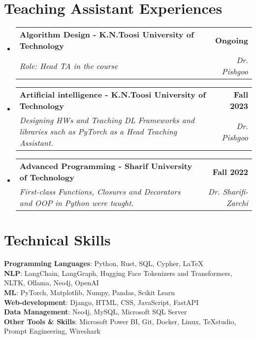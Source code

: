 \documentclass[letterpaper,11pt]{article}
\makeatletter
\newcommand{\resumeSubheading}[4]{
	\vspace{-2pt}\item
	\begin{tabular*}{1.0\textwidth}[t]{l@{\extracolsep{\fill}}r}
		\textbf{#1} & \textbf{\small #2} \\
		\textit{\small#3} & \textit{\small #4} \\
	\end{tabular*}\vspace{-7pt}
}
\newcommand{\resumeSubHeadingListStart}{\begin{itemize}[leftmargin=0.0in, label={}]}
\newcommand{\resumeSubHeadingListEnd}{\end{itemize}}
\makeatother
\begin{document}
	\section{\textcolor{title-color}{Teaching Assistant Experiences}}
	\resumeSubHeadingListStart
	
	\resumeSubheading
	{Algorithm Design - K.N.Toosi University of Technology}{Ongoing}
	{Role: Head TA in the course}{Dr. Pishgoo}
	\resumeSubheading
	{Artificial intelligence - K.N.Toosi University of Technology}{Fall 2023}
	{Designing HWs and Teaching DL Frameworks and libraries such as PyTorch as a Head Teaching Assistant. }{Dr. Pishgoo}
	
	\resumeSubheading
	{Advanced Programming - Sharif University of Technology}{Fall 2022}
	{First-class Functions, Closures and Decorators and OOP in Python were taught.}{Dr. Sharifi-Zarchi}
	\resumeSubHeadingListEnd
	\vspace{-9pt}


	
	\section{\textcolor{title-color}{Technical Skills}}
	\begin{itemize}[leftmargin=0.01in, label={}]
		\small{\item{
				\textbf{Programming Languages}{: Python, Rust, SQL, Cypher, \LaTeX} \\
				\textbf{NLP}{: LangChain, LangGraph, Hugging Face Tokenizers and Transformers, NLTK, Ollama, Neo4j, OpenAI} \\
				\textbf{ML}{: PyTorch, Matplotlib, Numpy, Pandas, Scikit Learn} \\
				\textbf{Web-development}{: Django, HTML, CSS, JavaScript, FastAPI} \\
				\textbf{Data Management}{: Neo4j, MySQL, Microsoft SQL Server} \\
				\textbf{Other Tools \& Skills}{: Microsoft Power BI, Git, Docker, Linux, TeXstudio, Prompt Engineering, Wireshark} \\
		}}
	\end{itemize}

	
\end{document}
